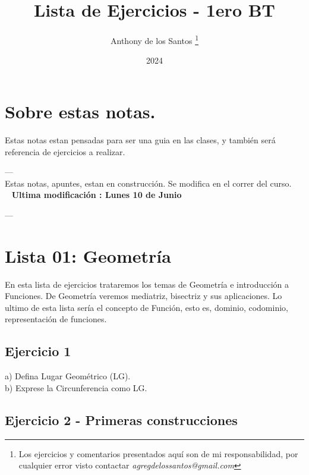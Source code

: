 \documentclass[11pt, a4paper]{article}
\title{ {\color{blue} Lista de Ejercicios - 1ero BT} }
\author{ Anthony de los Santos \footnote{ Los ejercicios y comentarios presentados aqu\'i son de mi responsabilidad, por cualquier
error visto contactar  \textit{agregdelossantos@gmail.com} } }
\date{ 2024 }
\begin{document}

\maketitle 

\newpage

\tableofcontents

\newpage



\vspace{20px}

\section{ Sobre estas notas. }

Estas notas estan pensadas para ser una guia en las clases, y tambi\'en ser\'a referencia 
de ejercicios a realizar. 

--- \\
Estas notas, apuntes, estan en construcci\'on. Se modifica en el correr del curso. ~ ~ \textbf{ {\color{red} Ultima modificaci\'on : Lunes 10 de Junio } }

--- \\

\section{ Lista 01: Geometr\'ia }

En esta lista de ejercicios trataremos los temas de Geometr\'ia e introducci\'on a Funciones. De Geometr\'ia veremos mediatriz, bisectriz y sus aplicaciones. Lo ultimo de esta lista ser\'ia el concepto de Funci\'on, esto es, dominio, codominio, representaci\'on de funciones. \\

\subsection*{ Ejercicio 1 }

a) Defina Lugar Geom\'etrico (LG). \\
b) Exprese la Circunferencia como LG. \\
\subsection*{ Ejercicio 2 - Primeras construcciones }
\end{document}
